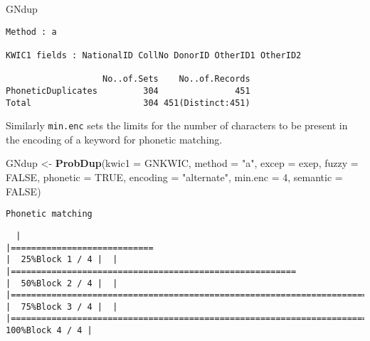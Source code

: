 \documentclass[
]{article}
\newenvironment{Shaded}{\begin{snugshade}}{\end{snugshade}}
\newcommand{\DataTypeTok}[1]{\textcolor[rgb]{0.13,0.29,0.53}{#1}}
\newcommand{\DecValTok}[1]{\textcolor[rgb]{0.00,0.00,0.81}{#1}}
\newcommand{\KeywordTok}[1]{\textcolor[rgb]{0.13,0.29,0.53}{\textbf{#1}}}
\newcommand{\NormalTok}[1]{#1}
\newcommand{\OtherTok}[1]{\textcolor[rgb]{0.56,0.35,0.01}{#1}}
\newcommand{\StringTok}[1]{\textcolor[rgb]{0.31,0.60,0.02}{#1}}
\begin{document}
\begin{Shaded}
\begin{Highlighting}[]
\NormalTok{GNdup}
\end{Highlighting}
\end{Shaded}

\begin{verbatim}
Method : a

KWIC1 fields : NationalID CollNo DonorID OtherID1 OtherID2
 
                   No..of.Sets    No..of.Records
PhoneticDuplicates         304               451
Total                      304 451(Distinct:451)
\end{verbatim}

Similarly \texttt{min.enc} sets the limits for the number of characters
to be present in the encoding of a keyword for phonetic matching.

\begin{Shaded}
\begin{Highlighting}[]
\NormalTok{GNdup <-}\StringTok{ }\KeywordTok{ProbDup}\NormalTok{(}\DataTypeTok{kwic1 =}\NormalTok{ GNKWIC, }\DataTypeTok{method =} \StringTok{"a"}\NormalTok{, }\DataTypeTok{excep =}\NormalTok{ exep, }
                 \DataTypeTok{fuzzy =} \OtherTok{FALSE}\NormalTok{,}
                 \DataTypeTok{phonetic =} \OtherTok{TRUE}\NormalTok{, }\DataTypeTok{encoding =} \StringTok{"alternate"}\NormalTok{, }\DataTypeTok{min.enc =} \DecValTok{4}\NormalTok{,}
                 \DataTypeTok{semantic =} \OtherTok{FALSE}\NormalTok{)}
\end{Highlighting}
\end{Shaded}

\begin{verbatim}
Phonetic matching
\end{verbatim}

\begin{verbatim}
  |                                                                                                                       |============================                                                                                   |  25%Block 1 / 4 |  |                                                                                                                       |========================================================                                                       |  50%Block 2 / 4 |  |                                                                                                                       |===================================================================================                            |  75%Block 3 / 4 |  |                                                                                                                       |===============================================================================================================| 100%Block 4 / 4 |
\end{verbatim}
\end{document}
